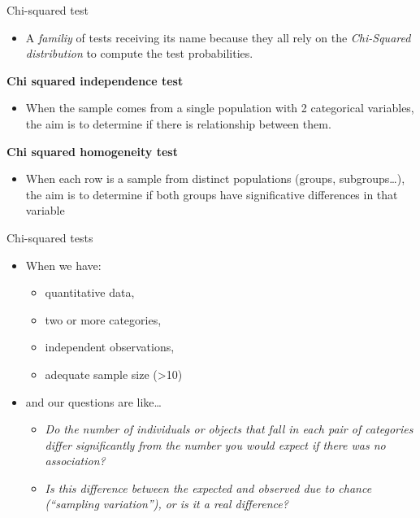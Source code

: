 \documentclass[
  ignorenonframetext,
]{beamer}
\providecommand{\tightlist}{%
  \setlength{\itemsep}{0pt}\setlength{\parskip}{0pt}}
\begin{document}
\begin{frame}{Chi-squared test}
\protect\hypertarget{chi-squared-test}{}
\begin{itemize}
\tightlist
\item
  A \emph{familiy} of tests receiving its name because they all rely on
  the \emph{Chi-Squared distribution} to compute the test probabilities.
\end{itemize}

\textbf{Chi squared independence test}

\begin{itemize}
\tightlist
\item
  When the sample comes from a single population with 2 categorical
  variables, the aim is to determine if there is relationship between
  them.
\end{itemize}

\textbf{Chi squared homogeneity test}

\begin{itemize}
\tightlist
\item
  When each row is a sample from distinct populations (groups,
  subgroups\ldots), the aim is to determine if both groups have
  significative differences in that variable
\end{itemize}
\end{frame}

\begin{frame}{Chi-squared tests}
\protect\hypertarget{chi-squared-tests}{}
\begin{itemize}
\item
  When we have:

  \begin{itemize}
  \tightlist
  \item
    quantitative data,
  \item
    two or more categories,
  \item
    independent observations,
  \item
    adequate sample size (\textgreater10)
  \end{itemize}
\item
  and our questions are like\ldots{}

  \begin{itemize}
  \item
    \emph{Do the number of individuals or objects that fall in each pair
    of categories differ significantly from the number you would expect
    if there was no association?}
  \item
    \emph{Is this difference between the expected and observed due to
    chance (``sampling variation''), or is it a real difference?}
  \end{itemize}
\end{itemize}
\end{frame}
\end{document}
